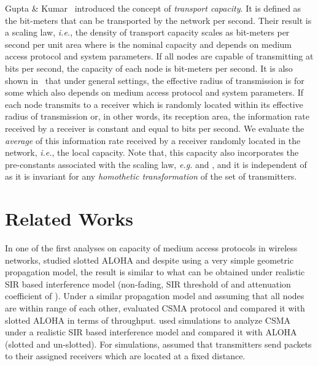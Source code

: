 \documentclass[12pt,english]{article}
\begin{document}
Gupta \& Kumar~\cite{Gupta:Kumar} introduced the concept of {\em transport capacity}. It is defined as the bit-meters that can be transported by the network per second. Their result is a scaling law, {\it i.e.}, the density of transport capacity scales as  bit-meters per second per unit area where  is the nominal capacity and \mbox{} depends on medium access protocol and system parameters. If all nodes are capable of transmitting at  bits per second, the capacity of each node is  bit-meters per second. It is also shown in~\cite{Gupta:Kumar} that under general settings, the effective radius of transmission is  for some \mbox{} which also depends on medium access protocol and system parameters. If each node transmits to a receiver which is randomly located within its effective radius of transmission or, in other words, its reception area, the information rate received by a receiver is constant and equal to  bits per second. We evaluate the {\em average} of this information rate received by a receiver randomly located in the network, {\it i.e.}, the local capacity. Note that, this capacity also incorporates the pre-constants associated with the scaling law, {\it e.g.}  and , and it is independent of  as it is invariant for any {\em homothetic transformation} of the set of transmitters. 

\section{Related Works}
\label{sec:context}

In one of the first analyses on capacity of medium access protocols in wireless networks, \cite{Nelson:Kleinrock} studied slotted ALOHA and despite using a very simple geometric propagation model, the result is similar to what can be obtained under realistic SIR based interference model (non-fading, SIR threshold of  and attenuation coefficient of ). Under a similar propagation model and assuming that all nodes are within range of each other, \cite{CSMA} evaluated CSMA protocol and compared it with slotted ALOHA in terms of throughput. \cite{Bartek} used simulations to analyze CSMA under a realistic SIR based interference model and compared it with ALOHA (slotted and un-slotted). For simulations, \cite{Bartek} assumed that transmitters send packets to their assigned receivers which are located at a fixed distance. 
\end{document}
